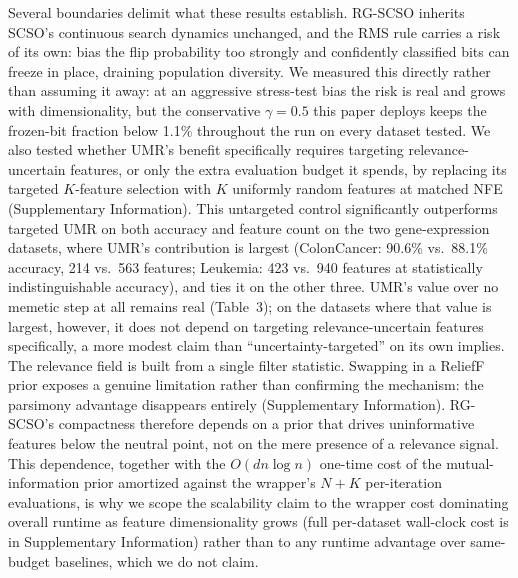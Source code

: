 \documentclass[preprint,3p,times]{elsarticle}
\begin{document}
Several boundaries delimit what these results establish. RG-SCSO inherits
SCSO's continuous search dynamics unchanged, and the RMS rule carries a risk
of its own: bias the flip probability too strongly and confidently classified
bits can freeze in place, draining population diversity. We measured this
directly rather than assuming it away: at an aggressive stress-test bias the
risk is real and grows with dimensionality, but the conservative $\gamma=0.5$
this paper deploys keeps the frozen-bit fraction below
1.1\% throughout
the run on every dataset tested. We also tested whether UMR's benefit
specifically requires targeting relevance-uncertain features, or only the
extra evaluation budget it spends, by replacing its targeted $K$-feature
selection with $K$ uniformly random features at matched NFE (Supplementary
Information). This untargeted control significantly outperforms targeted
UMR on both accuracy and feature count on the two gene-expression datasets,
where UMR's contribution is largest (ColonCancer: 90.6\% vs.\ 88.1\%
accuracy, 214 vs.\ 563 features; Leukemia: 423 vs.\ 940 features at
statistically indistinguishable accuracy), and ties it on the other three.
UMR's value over no memetic step at all remains real (Table~3); on the
datasets where that value is largest, however, it does not depend on
targeting relevance-uncertain features specifically, a more modest claim
than ``uncertainty-targeted'' on its own implies. The relevance field is
built from a single filter statistic. Swapping in a ReliefF prior exposes a
genuine limitation rather than confirming the mechanism: the parsimony
advantage disappears entirely (Supplementary Information). RG-SCSO's
compactness therefore depends on a prior that drives uninformative features
below the neutral point, not on the mere presence of a relevance signal. This dependence, together with the
$O(dn\log n)$ one-time cost of the mutual-information prior amortized
against the wrapper's $N+K$ per-iteration evaluations, is why we scope the
scalability claim to the wrapper cost dominating overall runtime as feature
dimensionality grows (full per-dataset wall-clock cost is in Supplementary
Information) rather than to any runtime advantage over same-budget
baselines, which we do not claim.
\end{document}
